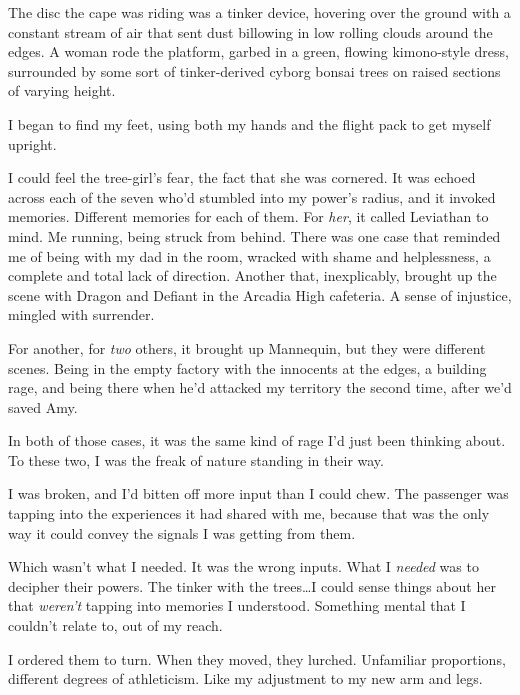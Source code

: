 The disc the cape was riding was a tinker device, hovering over the ground with a constant stream of air that sent dust billowing in low rolling clouds around the edges.  A woman rode the platform, garbed in a green, flowing kimono-style dress, surrounded by some sort of tinker-derived cyborg bonsai trees on raised sections of varying height.



I began to find my feet, using both my hands and the flight pack to get myself upright.



I could feel the tree-girl's fear, the fact that she was cornered.  It was echoed across each of the seven who'd stumbled into my power's radius, and it invoked memories.  Different memories for each of them.  For \emph{her}, it called Leviathan to mind.  Me running, being struck from behind.  There was one case that reminded me of being with my dad in the room, wracked with shame and helplessness, a complete and total lack of direction.  Another that, inexplicably, brought up the scene with Dragon and Defiant in the Arcadia High cafeteria.  A sense of injustice, mingled with surrender.



For another, for \emph{two} others, it brought up Mannequin, but they were different scenes.  Being in the empty factory with the innocents at the edges, a building rage, and being there when he'd attacked my territory the second time, after we'd saved Amy.



In both of those cases, it was the same kind of rage I'd just been thinking about.  To these two, I was the freak of nature standing in their way.



I was broken, and I'd bitten off more input than I could chew.  The passenger was tapping into the experiences it had shared with me, because that was the only way it could convey the signals I was getting from them.



Which wasn't what I needed.  It was the wrong inputs.  What I \emph{needed} was to decipher their powers.  The tinker with the trees\ldots I could sense things about her that \emph{weren't} tapping into memories I understood.  Something mental that I couldn't relate to, out of my reach.



I ordered them to turn.  When they moved, they lurched.  Unfamiliar proportions, different degrees of athleticism.  Like my adjustment to my new arm and legs.



